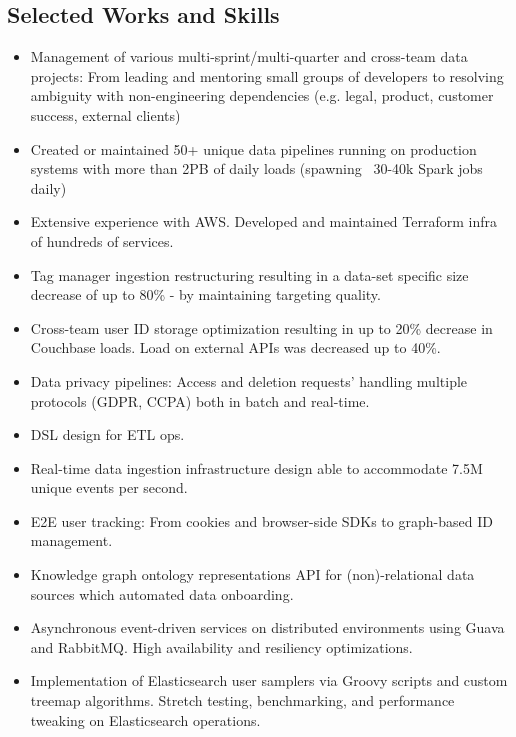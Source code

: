 \documentclass{article}
\begin{document}
	\vspace{+0.5cm}
	\begin{multicols}{2}
	
		\section*{\color{NavyBlue}Selected Works and Skills}
		\vspace{-0.5cm}
		{\color{NavyBlue}\hrulefill}
			\begin{itemize}
                \item Management of various multi-sprint/multi-quarter and cross-team data projects: From leading and mentoring small groups of developers to resolving ambiguity with non-engineering dependencies (e.g. legal, product, customer success, external clients)
                \item Created or maintained 50+ unique data pipelines running on production systems with more than 2PB of daily loads (spawning ~30-40k Spark jobs daily) 
                \item Extensive experience with AWS. Developed and maintained Terraform infra of hundreds of services.
                \item Tag manager ingestion restructuring resulting in a data-set specific size decrease of up to 80\% - by maintaining targeting quality.
                \item Cross-team user ID storage optimization resulting in up to 20\% decrease in Couchbase loads. Load on external APIs was decreased up to 40\%. 
                \item Data privacy pipelines: Access and deletion requests' handling multiple protocols (GDPR, CCPA) both in batch and real-time.
				\item DSL design for ETL ops.
				\item Real-time data ingestion infrastructure design able to accommodate 7.5M unique events per second.
				\item E2E user tracking: From cookies and browser-side SDKs to graph-based ID management.
				\item Knowledge graph ontology representations API for (non)-relational data sources which automated data onboarding.
				\item Asynchronous event-driven services on distributed environments using Guava and RabbitMQ. High availability and resiliency optimizations.
				\item Implementation of Elasticsearch user samplers via Groovy scripts and custom treemap algorithms. Stretch testing, benchmarking, and performance tweaking on Elasticsearch operations.

\end{itemize}
\end{multicols}
\end{document}
